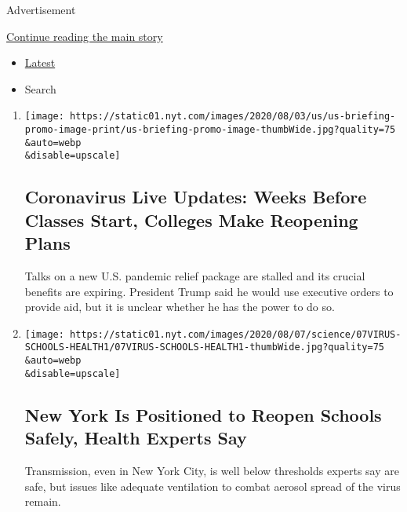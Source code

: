 Advertisement

\protect\hyperlink{after-mid1}{Continue reading the main story}

\begin{itemize}
\tightlist
\item
  \protect\hyperlink{stream-panel}{Latest}
\item
  Search
\end{itemize}

\begin{enumerate}
\def\labelenumi{\arabic{enumi}.}
\item
  \href{/2020/08/08/world/coronavirus-updates.html}{}

  \texttt{[image: https://static01.nyt.com/images/2020/08/03/us/us-briefing-promo-image-print/us-briefing-promo-image-thumbWide.jpg?quality=75\\\&auto=webp\\\&disable=upscale]}

  \hypertarget{coronavirus-live-updates-weeks-before-classes-start-colleges-make-reopening-plans}{%
  \subsection{Coronavirus Live Updates: Weeks Before Classes Start,
  Colleges Make Reopening
  Plans}\label{coronavirus-live-updates-weeks-before-classes-start-colleges-make-reopening-plans}}

  Talks on a new U.S. pandemic relief package are stalled and its
  crucial benefits are expiring. President Trump said he would use
  executive orders to provide aid, but it is unclear whether he has the
  power to do so.
\item
  \href{/2020/08/07/health/coronavirus-ny-schools-reopen.html}{}

  \texttt{[image: https://static01.nyt.com/images/2020/08/07/science/07VIRUS-SCHOOLS-HEALTH1/07VIRUS-SCHOOLS-HEALTH1-thumbWide.jpg?quality=75\\\&auto=webp\\\&disable=upscale]}

  \hypertarget{new-york-is-positioned-to-reopen-schools-safely-health-experts-say}{%
  \subsection{New York Is Positioned to Reopen Schools Safely, Health
  Experts
  Say}\label{new-york-is-positioned-to-reopen-schools-safely-health-experts-say}}

  Transmission, even in New York City, is well below thresholds experts
  say are safe, but issues like adequate ventilation to combat aerosol
  spread of the virus remain.


\end{enumerate}
